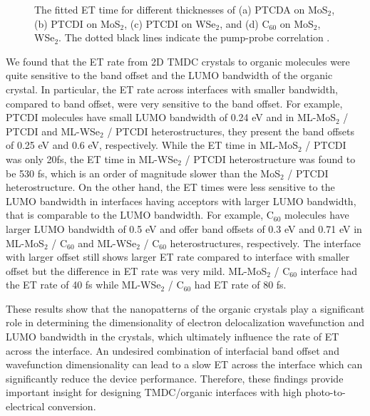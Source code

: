 \documentclass[12pt]{article}
\begin{document}
\begin{figure}[H]
\caption{The fitted ET time for different thicknesses of (a) PTCDA on MoS$_2$, (b) PTCDI on MoS$_2$, (c) PTCDI on WSe$_2$, and (d) C$_{60}$ on MoS$_2$, WSe$_2$. The dotted black lines indicate the pump-probe correlation \cite{rijal2020collective}.}\label{fig:CT rate fitting}
\end{figure}

We found that the ET rate from 2D TMDC crystals to organic molecules were quite sensitive to the band offset and the LUMO bandwidth of the organic crystal. In particular, the ET rate across interfaces with smaller bandwidth, compared to band offset, were very sensitive to the band offset. For example, PTCDI molecules have small LUMO bandwidth of  0.24 eV and in ML-MoS$_2$ / PTCDI and ML-WSe$_2$ / PTCDI heterostructures, they present the band offsets of 0.25 eV and 0.6 eV, respectively. While the ET time in ML-MoS$_2$ / PTCDI was only 20fs, the ET time in ML-WSe$_2$ / PTCDI heterostructure was found to be 530 fs, which is an order of magnitude slower than the MoS$_2$ / PTCDI heterostructure. On the other hand, the ET times were less sensitive to the LUMO bandwidth in interfaces having acceptors with larger LUMO bandwidth, that is comparable to the LUMO bandwidth. For example, C$_{60}$ molecules have larger LUMO bandwidth of 0.5 eV and offer band offsets of 0.3 eV and 0.71 eV in ML-MoS$_2$ / C$_{60}$ and ML-WSe$_2$ / C$_{60}$ heterostructures, respectively. The interface with larger offset still shows larger ET rate compared to interface with smaller offset but the difference in ET rate was very mild. ML-MoS$_2$ / C$_{60}$ interface had the ET rate of 40 fs while ML-WSe$_2$ / C$_{60}$ had ET rate of 80 fs. 
\vspace{7pt}

These results show that the nanopatterns of the organic crystals play a significant role in determining the dimensionality of electron delocalization wavefunction and LUMO bandwidth in the crystals, which ultimately influence the rate of ET across the interface. An undesired combination of interfacial band offset and wavefunction dimensionality can lead to a slow ET across the interface which can significantly reduce the device performance. Therefore, these findings provide important insight for designing TMDC/organic interfaces with high photo-to-electrical conversion.
\end{document}

